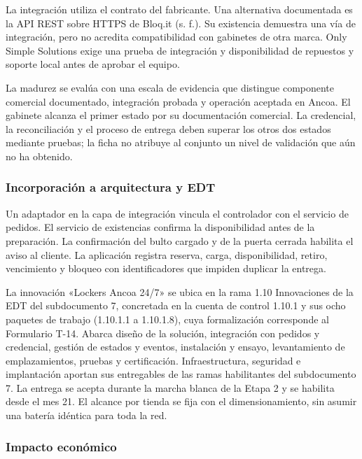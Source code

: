 \documentclass[11pt]{article}
\begin{document}
La integración utiliza el contrato del fabricante. Una alternativa documentada es la API REST sobre HTTPS de Bloq.it (s. f.). Su existencia demuestra una vía de integración, pero no acredita compatibilidad con gabinetes de otra marca. Only Simple Solutions exige una prueba de integración y disponibilidad de repuestos y soporte local antes de aprobar el equipo.

La madurez se evalúa con una escala de evidencia que distingue componente comercial documentado, integración probada y operación aceptada en Ancoa. El gabinete alcanza el primer estado por su documentación comercial. La credencial, la reconciliación y el proceso de entrega deben superar los otros dos estados mediante pruebas; la ficha no atribuye al conjunto un nivel de validación que aún no ha obtenido.

\subsubsection{Incorporación a arquitectura y EDT}\label{incorporaciuxf3n-a-arquitectura-y-edt}

Un adaptador en la capa de integración vincula el controlador con el servicio de pedidos. El servicio de existencias confirma la disponibilidad antes de la preparación. La confirmación del bulto cargado y de la puerta cerrada habilita el aviso al cliente. La aplicación registra reserva, carga, disponibilidad, retiro, vencimiento y bloqueo con identificadores que impiden duplicar la entrega.

La innovación «Lockers Ancoa 24/7» se ubica en la rama 1.10 Innovaciones de la EDT del subdocumento 7, concretada en la cuenta de control 1.10.1 y sus ocho paquetes de trabajo (1.10.1.1 a 1.10.1.8), cuya formalización corresponde al Formulario T-14. Abarca diseño de la solución, integración con pedidos y credencial, gestión de estados y eventos, instalación y ensayo, levantamiento de emplazamientos, pruebas y certificación. Infraestructura, seguridad e implantación aportan sus entregables de las ramas habilitantes del subdocumento 7. La entrega se acepta durante la marcha blanca de la Etapa 2 y se habilita desde el mes 21. El alcance por tienda se fija con el dimensionamiento, sin asumir una batería idéntica para toda la red.

\subsubsection{Impacto económico}\label{impacto-econuxf3mico}
\end{document}
